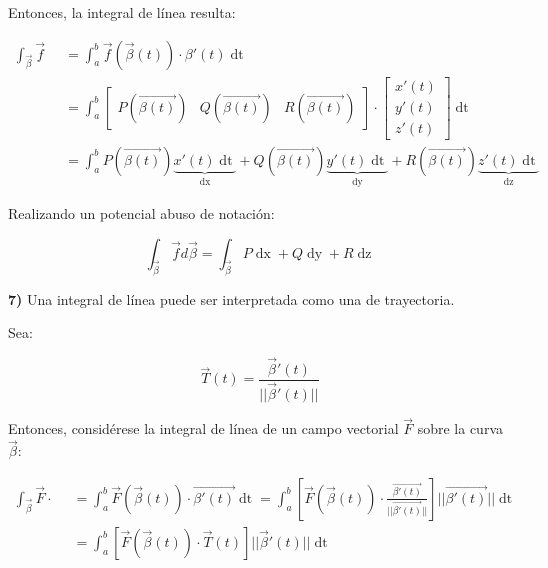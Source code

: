 \documentclass{article}
\begin{document}
Entonces, la integral de línea resulta:

\begin{subequations}
\begin{align}
\int_{\overrightarrow{\beta}} \overrightarrow{f} \mathop{\overrightarrow{d\beta}} &= \int_{a}^{b} \overrightarrow{f}(\overrightarrow{\beta}(t)) \cdot \beta'(t) \mathop{dt} \\
&= \int_{a}^{b} \begin{bmatrix}P(\overrightarrow{\beta(t)}) & Q(\overrightarrow{\beta(t)}) & R(\overrightarrow{\beta(t)})\end{bmatrix} \cdot \begin{bmatrix}x'(t) \\ y'(t) \\ z'(t)\end{bmatrix} \mathop{dt} \\
&= \int_{a}^{b} P(\overrightarrow{\beta(t)}) \underbrace{x'(t) \mathop{dt}}_{\mathop{dx}} + Q(\overrightarrow{\beta(t)}) \underbrace{y'(t) \mathop{dt}}_{\mathop{dy}} + R(\overrightarrow{\beta(t)}) \underbrace{z'(t) \mathop{dt}}_{\mathop{dz}}
\end{align}
\end{subequations}

Realizando un potencial abuso de notación:

\begin{equation}
\int_{\overrightarrow{\beta}} \overrightarrow{f} d\overrightarrow{\beta} = \int_{\overrightarrow{\beta}} P \mathop{dx} + Q \mathop{dy} + R \mathop{dz}
\end{equation}

\textbf{7)} Una integral de línea puede ser interpretada como una de trayectoria.

Sea:

\begin{equation}
\overrightarrow{T}(t) = \frac{ \overrightarrow{\beta}'(t) }{||\overrightarrow{\beta}'(t)||}
\end{equation}

Entonces, considérese la integral de línea de un campo vectorial $\overrightarrow{F}$ sobre la curva $\overrightarrow{\beta}$:

\begin{subequations}
\begin{align}
\int_{\overrightarrow{\beta}} \overrightarrow{F} \cdot \mathop{\overrightarrow{d\beta}} &= \int_{a}^b \overrightarrow{F}(\overrightarrow{\beta}(t)) \cdot \overrightarrow{\beta'(t)} \mathop{dt} = \int_{a}^b \left[ \overrightarrow{F}(\overrightarrow{\beta}(t)) \cdot \frac{ \overrightarrow{\beta'(t)} }{||\overrightarrow{\beta'(t)}||} \right] ||\overrightarrow{\beta'(t)}|| \mathop{dt} \\
&= \int_{a}^b \left[ \overrightarrow{F}(\overrightarrow{\beta}(t)) \cdot \overrightarrow{T}(t) \right] ||\overrightarrow{\beta}'(t)|| \mathop{dt}
\end{align}
\end{subequations}
\end{document}
